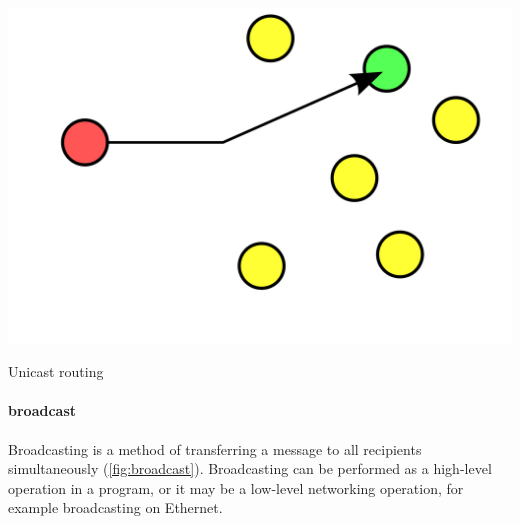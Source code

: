 \begin{marginfigure}
\includegraphics[width=\textwidth]{images/introduction/unicast.png}
\caption[Unicast routing scheme]{Unicast routing}
\label{fig:unicast}
\end{marginfigure}


\paragraph{broadcast}
Broadcasting is a method of transferring a message to all recipients simultaneously (\cref{fig:broadcast}).
Broadcasting can be performed as a high-level operation in a program, or it may be a low-level networking operation, for example broadcasting on Ethernet.

